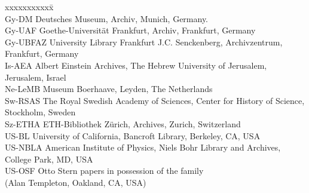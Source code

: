 \documentclass{article}
\begin{document}
\begin{tabbing}
xxxxxxxxxxx\=\kill\\
Gy-DM     \> Deutsches Museum, Archiv, Munich, Germany. \\
Gy-UAF   \> Goethe-Universität Frankfurt, Archiv, Frankfurt, Germany\\
Gy-UBFAZ \> University Library Frankfurt J.C. Senckenberg, Archivzentrum,\\
                \> Frankfurt, Germany\\
Is-AEA      \> Albert Einstein Archives, The Hebrew University of Jerusalem,\\
                 \> Jerusalem, Israel\\
Ne-LeMB    \> Museum Boerhaave, Leyden, The Netherlands \\
Sw-RSAS \> The Royal Swedish Academy of Sciences, Center for History of Science, \\
                \> Stockholm, Sweden \\
Sz-ETHA  \> ETH-Bibliothek Z\"urich, Archives, Zurich, Switzerland \\
US-BL      \>  University of California, Bancroft Library, Berkeley, CA, USA\\
US-NBLA  \> American Institute of Physics,  Niels Bohr Library and Archives, \\
                 \> College Park, MD, USA\\
US-OSF \> Otto Stern papers in possession of the family \\
                  \> (Alan Templeton, Oakland, CA, USA) 
\end{tabbing}





\end{document}
